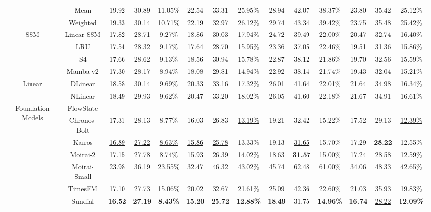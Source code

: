 \begin{table}[t]
{\begin{tabular}{c|c|c|c|c|c|c|c|c|c|c|c|c|c}
 & Mean & 19.92 & 30.89 & 11.05\% & 22.54 & 33.31 & 25.95\% & 28.94 & 42.07 & 38.37\% & 23.80 & 35.42 & 25.12\% \\
 & Weighted & 19.33 & 30.14 & 10.71\% & 22.19 & 32.97 & 26.12\% & 29.74 & 43.34 & 39.42\% & 23.75 & 35.48 & 25.42\% \\
\midrule
\multirow{4}{*}{SSM} & Linear SSM & 17.82 & 28.71 & 9.27\% & 18.86 & 30.03 & 17.94\% & 24.72 & 39.49 & 22.00\% & 20.47 & 32.74 & 16.40\% \\
 & LRU & 17.54 & 28.32 & 9.17\% & 17.64 & 28.70 & 15.95\% & 23.36 & 37.05 & 22.46\% & 19.51 & 31.36 & 15.86\% \\
 & S4 & 17.66 & 28.62 & 9.13\% & 18.56 & 30.94 & 15.78\% & 22.87 & 38.12 & 21.86\% & 19.70 & 32.56 & 15.59\% \\
 & Mamba-v2 & 17.30 & 28.17 & 8.94\% & 18.08 & 29.81 & 14.94\% & 22.92 & 38.14 & 21.74\% & 19.43 & 32.04 & 15.21\% \\
\midrule
\multirow{2}{*}{Linear} & DLinear & 18.58 & 30.14 & 9.69\% & 20.33 & 33.16 & 17.32\% & 26.01 & 41.64 & 22.01\% & 21.64 & 34.98 & 16.34\% \\
 & NLinear & 18.49 & 29.93 & 9.62\% & 20.47 & 33.20 & 18.02\% & 26.05 & 41.60 & 22.18\% & 21.67 & 34.91 & 16.61\% \\
\midrule
\multirow{7}{*}{Foundation Models} & FlowState & - & - & - & - & - & - & - & - & - & - & - & - \\
 & Chronos-Bolt & 17.31 & 28.13 & 8.77\% & 16.03 & 26.83 & \underline{13.19\%} & 19.21 & 32.42 & 15.22\% & 17.52 & 29.13 & \underline{12.39\%} \\
 & Kairos & \underline{16.89} & \underline{27.22} & \underline{8.63\%} & \underline{15.86} & \underline{25.78} & 13.33\% & 19.13 & \underline{31.65} & 15.70\% & 17.29 & \textbf{28.22} & 12.55\% \\
 & Moirai-2 & 17.15 & 27.78 & 8.74\% & 15.93 & 26.39 & 14.02\% & \underline{18.63} & \textbf{31.57} & \underline{15.00\%} & \underline{17.24} & 28.58 & 12.59\% \\
 & Moirai-Small & 23.98 & 36.19 & 23.55\% & 32.47 & 46.32 & 43.02\% & 45.74 & 62.48 & 61.00\% & 34.06 & 48.33 & 42.65\% \\
 & TimesFM & 17.10 & 27.73 & 15.06\% & 20.02 & 32.67 & 21.61\% & 25.09 & 42.36 & 22.60\% & 21.03 & 35.93 & 19.83\% \\
 & Sundial & \textbf{16.52} & \textbf{27.19} & \textbf{8.43\%} & \textbf{15.20} & \textbf{25.72} & \textbf{12.88\%} & \textbf{18.49} & 31.75 & \textbf{14.96\%} & \textbf{16.74} & \underline{28.22} & \textbf{12.09\%} \\

\end{tabular}}
\end{table}
